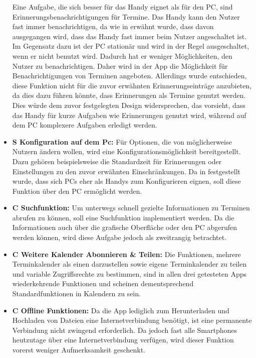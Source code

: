 \begin{itemize}
		Eine Aufgabe, die sich besser für das Handy eignet als für den PC, sind Erinnerungsbenachrichtigungen für Termine. 
			Das Handy kann den Nutzer fast immer benachrichtigen, da wie in  erwähnt wurde, dass davon ausgegangen wird, dass das Handy fast immer beim Nutzer angeschaltet ist. Im Gegensatz dazu ist der PC stationär und wird in der Regel ausgeschaltet, wenn er nicht benutzt wird. Dadurch hat er weniger Möglichkeiten, den Nutzer zu benachrichtigen.\newline%
		Daher wird in der App die Möglichkeit für Benachrichtigungen von Terminen angeboten. %
		Allerdings wurde entschieden, diese Funktion nicht für die zuvor erwähnten Erinnerungseinträge anzubieten, da dies dazu führen könnte, dass Erinnerungen als Termine genutzt werden. Dies würde dem zuvor festgelegten Design widersprechen, das vorsieht, dass das Handy für kurze Aufgaben wie Erinnerungen genutzt wird, während auf dem PC komplexere Aufgaben erledigt werden.%
	\item \textbf{S Konfiguration auf dem Pc:} %
		Für Optionen, die von möglicherweise Nutzern ändern wollen, wird eine Konfigurationsmöglichkeit bereitgestellt. %
			Dazu gehören beispielsweise die Standardzeit für Erinnerungen oder Einstellungen zu den zuvor erwähnten Einschränkungen. %
		Da in  festgestellt wurde, dass sich PCs eher als Handys zum Konfigurieren eignen, soll diese Funktion über den PC ermöglicht werden.%
	\item \textbf{C Suchfunktion:} %
		Um unterwegs schnell gezielte Informationen zu Terminen abrufen zu können, soll eine Suchfunktion implementiert werden. %
		Da die Informationen auch über die grafische Oberfläche oder den PC abgerufen werden können, wird diese Aufgabe jedoch als zweitrangig betrachtet.%
	\item \textbf{C Weitere Kalender Abonnieren \& Teilen:} %
		Die Funktionen, mehrere Terminkalender als einen darzustellen sowie eigene Terminkalender zu teilen und variable Zugriffsrechte zu bestimmen, sind in allen drei getesteten Apps wiederkehrende Funktionen und scheinen dementsprechend Standardfunktionen in Kalendern zu sein. %
		
	\item \textbf{C Offline Funktionen:} %
		Da die App lediglich zum Herunterladen und Hochladen von Dateien eine Internetverbindung benötigt, ist eine permanente Verbindung nicht zwingend erforderlich. %
		Da jedoch fast alle Smartphones heutzutage über eine Internetverbindung verfügen, wird dieser Funktion vorerst weniger Aufmerksamkeit geschenkt.%


\end{itemize}
